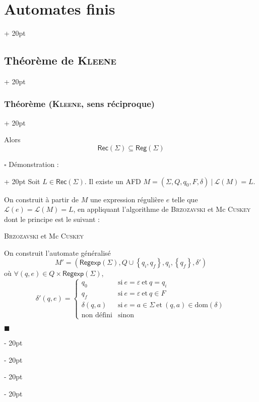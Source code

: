 \documentclass[a4paper, 12pt, twoside]{article}
\newenvironment{indalgo}[2][H]{
    \begin{algoBox}
        \begin{algorithm}[#1]
            \caption{#2}
}
{
        \end{algorithm}
    \end{algoBox}
}
\newcommand{\lr}[1]{\left( #1 \right)}
\newcommand{\set}[1]{\left\{ #1 \right\}}
\newcommand{\ind}[1][20pt]{\advance\leftskip + #1}
\newcommand{\deind}[1][20pt]{\advance\leftskip - #1}
\newenvironment{indt}[2][20pt]{#2 \par \ind[#1]}{\par \deind} %
\newenvironment{proof}[1][{Démonstration :}]{\begin{indt}{$\square$ #1}}{$\blacksquare$ \end{indt}}
\newcommand{\Reg}{\mathsf{Reg}}
\newcommand{\Regexp}{\mathsf{Regexp}}
\newcommand{\Rec}[1]{\mathsf{Rec}\!\lr{#1}}
\begin{document}
\begin{indt}{\section{Automates finis}}
\begin{indt}{\subsection{Théorème de \textsc{Kleene}}}
\begin{indt}{\subsubsection{Théorème (\textsc{Kleene}, sens réciproque)}}
\begin{emphBox}
                    Alors
                    \[
                        \Rec \Sigma \subseteq \Reg(\Sigma)
                    \]
                \end{emphBox}

                \vspace{6pt}
                
                \begin{proof}
                    Soit $L \in \Rec \Sigma$. Il existe un AFD $M = (\Sigma, Q, q_0, F, \delta)\ |\ \mathcal L(M) = L$.

                    On construit à partir de $M$ une expression régulière $e$ telle que $\mathcal L(e) = \mathcal L(M) = L$, en appliquant l'algorithme de \textsc{Brzozavski} et Mc \textsc{Cuskey} dont le principe est le suivant :

                    \begin{indalgo}{\textsc{Brzozavski} et Mc \textsc{Cuskey}}
                        \label{alg:4}

                        On construit l'automate généralisé
                        \[
                            M' = (\Regexp(\Sigma), Q \cup \set{q_i, q_f}, q_i, \set{q_f}, \delta')
                        \]
                        où
                        $\forall (q, e) \in Q \times \Regexp(\Sigma)$,
                        \[
                            \delta'(q, e) =
                            \begin{cases}
                                q_0
                                & \text{si}\ e = \varepsilon\ \text{et}\ q = q_i
                                \\
                                q_f
                                & \text{si}\ e = \varepsilon\ \text{et}\ q \in F
                                \\
                                \delta(q, a)
                                & \text{si}\ e = a \in \Sigma\ \text{et}\ (q, a) \in \mathrm{dom}(\delta)
                                \\
                                \text{non défini}
                                & \text{sinon}
                            \end{cases}
                        \]

                        \begin{center}
\end{center}
\end{indalgo}
\end{proof}
\end{indt}
\end{indt}
\end{indt}
\end{document}
